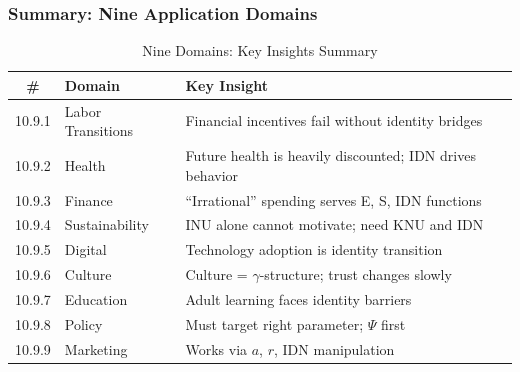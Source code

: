 \subsubsection{Summary: Nine Application Domains}

\begin{table}[htbp]
\centering
\caption{Nine Domains: Key Insights Summary}
\label{tab:domains-summary}
\small
\renewcommand{\arraystretch}{1.2}
\begin{tabular}{@{}clp{6cm}@{}}
\toprule
\textbf{\#} & \textbf{Domain} & \textbf{Key Insight} \\
\midrule
10.9.1 & Labor Transitions & Financial incentives fail without identity bridges \\
10.9.2 & Health & Future health is heavily discounted; IDN drives behavior \\
10.9.3 & Finance & ``Irrational'' spending serves E, S, IDN functions \\
10.9.4 & Sustainability & INU alone cannot motivate; need KNU and IDN \\
10.9.5 & Digital & Technology adoption is identity transition \\
10.9.6 & Culture & Culture = $\gamma$-structure; trust changes slowly \\
10.9.7 & Education & Adult learning faces identity barriers \\
10.9.8 & Policy & Must target right parameter; $\Psi$ first \\
10.9.9 & Marketing & Works via $a$, $r$, IDN manipulation \\
\bottomrule
\end{tabular}
\end{table}

